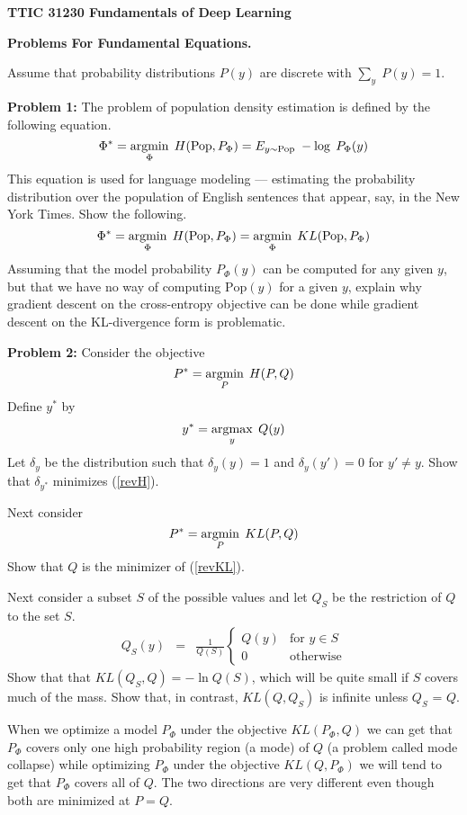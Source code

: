 \documentclass{article}
\begin{document}
\centerline{\bf TTIC 31230 Fundamentals of Deep Learning}
\centerline{\bf Problems For Fundamental Equations.}

\vfill
\vfill
Assume that probability distributions $P(y)$ are discrete with $\sum_y\;P(y) = 1$.

\bigskip
{\bf Problem 1:} The problem of population density estimation is defined by the following equation.
$$\Phi^* = \operatorname*{argmin}_\Phi\;H(\mathrm{Pop},P_\Phi) = E_{y \sim \mathrm{Pop}}\;-\log\;P_\Phi(y)$$
This equation is used for language modeling --- estimating the probability distribution over the population of English sentences that appear, say, in the New York Times.
Show the following.
$$\Phi^* = \operatorname*{argmin}_\Phi\;H(\mathrm{Pop},P_\Phi) = \operatorname*{argmin}_\Phi \;KL(\mathrm{Pop},P_\Phi)$$
Assuming that the model probability $P_\Phi(y)$ can be computed for any given $y$, but that we have no way of computing $\mathrm{Pop}(y)$ for a given $y$,
explain why gradient descent on the cross-entropy objective
can be done while gradient descent on the KL-divergence form is problematic.


\bigskip
{\bf Problem 2:} Consider the objective
\begin{equation}
  \label{revH}
  P^* = \operatorname*{argmin}_P\;H(P,Q)
\end{equation}
Define $y^*$ by
$$y^* = \operatorname*{argmax}_y\;Q(y)$$
Let $\delta_y$ be the distribution such that $\delta_y(y) = 1$ and $\delta_y(y') = 0$ for $y' \not = y$.
Show that $\delta_{y^*}$ minimizes (\ref{revH}).

Next consider
\begin{equation}
  \label{revKL}
  P^* = \operatorname*{argmin}_P\;KL(P,Q)
\end{equation}
Show that $Q$ is the minimizer of (\ref{revKL}).

Next consider a subset $S$ of the possible values and let $Q_S$ be the restriction of $Q$ to the set $S$.
\begin{eqnarray*}
  Q_S(y) & = & \frac{1}{Q(S)}\left\{\begin{array}{ll} Q(y) & \mbox{for $y \in S$} \\ 0 & \mbox{otherwise} \end{array}\right.
\end{eqnarray*}
Show that that $KL(Q_S,Q) = -\ln Q(S)$, which will be quite small if $S$ covers much of the mass. Show that, in contrast, $KL(Q,Q_S)$ is infinite unless
$Q_S$ = $Q$.

When we optimize a model $P_\Phi$ under the objective $KL(P_\Phi,Q)$ we can get that $P_\Phi$ covers only one high probability region (a mode) of $Q$ (a problem called mode collapse)
while optimizing $P_\Phi$ under the objective $KL(Q,P_\Phi)$ we will tend to get that $P_\Phi$ covers all of $Q$.  The two directions are very different even though both
are minimized at $P = Q$.
\end{document}

